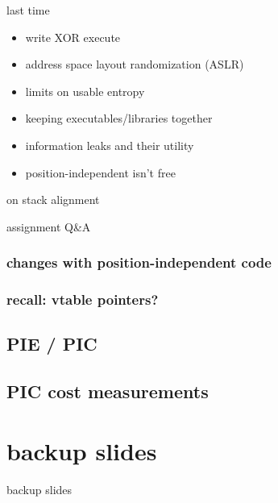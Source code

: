 \date{}
\title{}
\date{}

\begin{frame}
    \titlepage
\end{frame}



\begin{frame}{last time}
    \begin{itemize}
    \item write XOR execute
    \item address space layout randomization (ASLR)
    \item limits on usable entropy
    \item keeping executables/libraries together
    \item information leaks and their utility
    \item position-independent isn't free
    \end{itemize}
\end{frame}

\begin{frame}{on stack alignment}
\end{frame}

\begin{frame}{assignment Q\&A}
\end{frame}


\subsubsection{changes with position-independent code}


\subsubsection{recall: vtable pointers?}


\subsection{PIE / PIC}


\subsection{PIC cost measurements}





\section{backup slides}
\begin{frame}{backup slides}
\end{frame}


